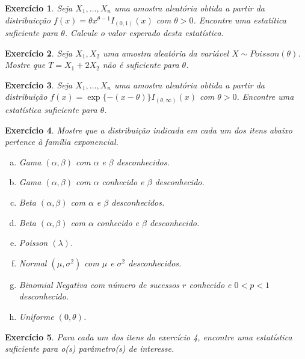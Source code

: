\documentclass[letter,11pt]{article}
\newtheorem{exer}{Exercício}
\begin{document}
\begin{exer} \rm
Seja $X_1,\ldots, X_n$ uma amostra aleatória obtida a partir da distribuicção $f(x) = \theta x^{\theta -1}I_{(0,1)}(x)$ com $\theta > 0$. Encontre uma estatítica suficiente para $\theta$. Calcule o valor esperado desta estatística.
\end{exer}


\smallskip
\begin{exer} \rm
Seja $X_1,X_2$ uma amostra aleatória da variável $X \sim Poisson(\theta)$. Mostre que $T = X_1 + 2X_2$ não é suficiente para $\theta$.
\end{exer}


\smallskip
\begin{exer} \rm
Seja $X_1,\ldots, X_n$ uma amostra aleatória obtida a partir da distribuição $f(x) = \exp\{-(x-\theta)\}I_{(\theta,\infty)}(x)$ com $\theta > 0$. Encontre uma estatística suficiente para $\theta$.
\end{exer}


\smallskip
\begin{exer} \rm
\item Mostre que a distribuição indicada em cada um dos itens abaixo pertence à família exponencial.
\begin{enumerate}[a)]
	\item Gama $(\alpha, \beta)$ com $\alpha$ e $\beta$ desconhecidos.
	\item Gama $(\alpha, \beta)$ com $\alpha$ conhecido e $\beta$ desconhecido.
	\item Beta $(\alpha, \beta)$ com $\alpha$ e $\beta$ desconhecidos.
	\item Beta $(\alpha, \beta)$ com $\alpha$ conhecido e $\beta$ desconhecido.
	\item Poisson $(\lambda)$.
	\item Normal $(\mu, \sigma^2)$ com $\mu$ e $\sigma^2$ desconhecidos.
	\item Binomial Negativa com número de sucessos $r$ conhecido e $0 < p < 1$ desconhecido.
  \item Uniforme $(0, \theta)$.
\end{enumerate}
\end{exer}


\smallskip
\begin{exer} \rm
Para cada um dos itens do exercício 4, encontre uma estatística suficiente para o(s) parâmetro(s) de interesse.
\end{exer}
\end{document}
